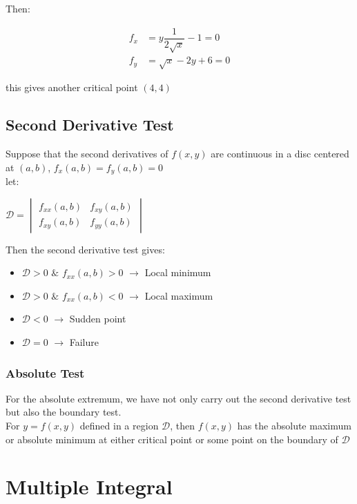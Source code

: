\documentclass[UTF8,a4paper, 10pt, openany]{svmono}
\begin{document}
Then:

\begin{align*}
f_x &=y\dfrac{1}{2\sqrt{x}}-1=0\\
f_y &=\sqrt{x}-2y+6=0
\end{align*}

this gives another critical point $(4,4)$

\section{Second Derivative Test}
Suppose that the second derivatives of $f(x,y)$ are continuous in a disc centered at $(a,b)$, $f_x(a,b)=f_y(a,b)=0$\\

let:
\begin{center}
$\boxed{\mathcal{D}=
\begin{vmatrix}
f_{xx}(a,b) & f_{xy}(a,b)\\
f_{xy}(a,b) & f_{yy}(a,b)
\end{vmatrix}
}$
\end{center}

Then the second derivative test gives:

\begin{itemize}
\item $\mathcal{D}>0$ $\&$ $f_{xx}(a,b)>0$ $\rightarrow$ Local minimum\\
\item $\mathcal{D}>0$ $\&$ $f_{xx}(a,b)<0$ $\rightarrow$ Local maximum\\
\item $\mathcal{D}<0$ $\rightarrow$ Sudden point \\
\item $\mathcal{D}=0$ $\rightarrow$ Failure
\end{itemize}

\subsection{Absolute Test}
For the absolute extremum, we have not only carry out the second derivative test but also the boundary test.\\
For $y=f(x,y)$ defined in a region $\mathcal{D}$, then $f(x,y)$ has the absolute maximum or absolute minimum at either critical point or some point on the boundary of $\mathcal{D}$

\chapter{Multiple Integral}
\end{document}
